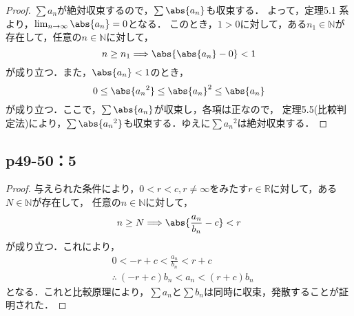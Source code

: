 \documentclass[a4paper,10pt,fleqn]{ltjsarticle}
\begin{document}
    \begin{tleftbar}
        \begin{proof}
            $\sum a_n $が絶対収束するので，$\sum \abs{a_n}$も収束する．
            よって，定理5.1 系より，$\lim_{n \to \infty} \abs{a_n} =0$となる．
            このとき，$1>0$に対して，ある$n_1 \in \mathbb{N}$が存在して，任意の$n \in \mathbb{N}$に対して，
            \[
                n \ge n_1 \Longrightarrow \abs{\abs{a_n} -0}<1
            \]
            が成り立つ．また，$\abs{a_n}<1$のとき，
            \[
                0 \le \abs{{a_n}^2} \le {\abs{a_n}}^2 \le \abs{a_n}
            \]
            が成り立つ．ここで，$\sum \abs{a_n}$が収束し，各項は正なので， 定理5.5(比較判定法)により，$\sum \abs{{a_n}^2}$も収束する．ゆえに$\sum {a_n}^2$は絶対収束する．
        \end{proof}
    \end{tleftbar}


    \subsection*{p49-50：5}

    \begin{tleftbar}
        \begin{proof}
            与えられた条件により，$0 <r <c , r \ne \infty $をみたす$r \in \mathbb{R}$に対して，ある$N \in \mathbb{N}$が存在して，
            任意の$n \in \mathbb{N}$に対して，
            \[
                n \ge N \Longrightarrow \abs{\frac{a_n}{b_n}-c}<r
            \]
            が成り立つ．これにより，
            \begin{align*}
                & 0<-r +c < \frac{a_n}{b_n} < r+c \\
                &\therefore ~  (-r+c) b_n < a_n < (r+c) b_n
            \end{align*}
            となる．これと比較原理により，$\sum a_n$と$\sum b_n$は同時に収束，発散することが証明された．
        \end{proof}
    \end{tleftbar}
\end{document}
